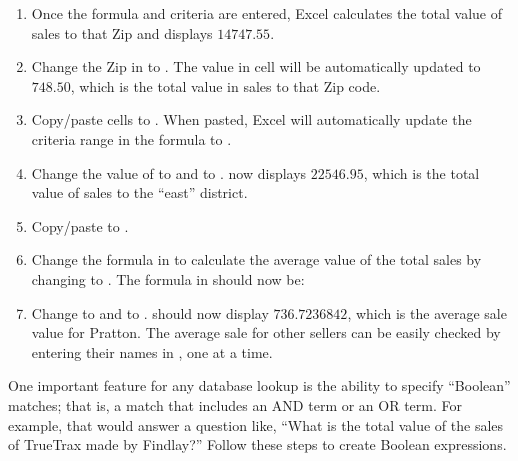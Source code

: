 \begin{enumerate}[resume]
	\item Once the formula and criteria are entered, Excel calculates the total value of sales to that Zip and displays $ 14747.55 $.
	\item Change the Zip in  to . The value in cell  will be automatically updated to $ 748.50 $, which is the total value in sales to that Zip code.
	\item Copy/paste cells  to . When pasted, Excel will automatically update the criteria range in the formula to .
	\item Change the value of  to  and  to .  now displays $ 22546.95 $, which is the total value of sales to the ``east'' district.
	\item Copy/paste  to .
	\item Change the formula in  to calculate the average value of the total sales by changing  to . The formula in  should now be: 
	\item Change  to  and  to .  should now display $ 736.7236842 $, which is the average sale value for Pratton. The average sale for other sellers can be easily checked by entering their names in , one at a time.
\end{enumerate}

One important feature for any database lookup is the ability to specify ``Boolean'' matches; that is, a match that includes an AND term or an OR term. For example, that would answer a question like, ``What is the total value of the sales of TrueTrax made by Findlay?'' Follow these steps to create Boolean expressions.

